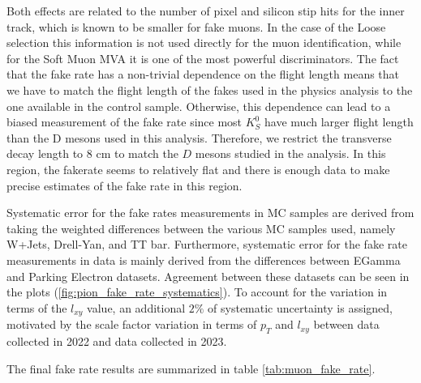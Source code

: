 Both effects are related to the number of pixel and silicon stip hits for the inner track, which is known to be smaller for fake muons. In the case of the Loose selection this information is not used directly for the muon identification, while for the Soft Muon MVA it is one of the most powerful discriminators. The fact that the fake rate has a non-trivial dependence on the flight length means that we have to match the flight length of the fakes used in the physics analysis to the one available in the control sample. Otherwise, this dependence can lead to a biased measurement of the fake rate since most $K_S^0$ have much larger flight length than the D mesons used in this analysis. Therefore, we restrict the transverse decay length to 8 cm to match the $D$ mesons studied in the analysis. In this region, the fakerate seems to relatively flat and there is enough data to make precise estimates of the fake rate in this region. 

Systematic error for the fake rates measurements in MC samples are derived from taking the weighted differences between the various MC samples used, namely W+Jets, Drell-Yan, and TT bar. Furthermore, systematic error for the fake rate measurements in data is mainly derived  from the differences between EGamma and Parking Electron datasets. Agreement between these datasets can be seen in the plots (\ref{fig:pion_fake_rate_systematics}). To account for the variation in terms of the $l_{xy}$ value, an additional $2\%$ of systematic uncertainty is assigned, motivated by the scale factor variation in terms of $p_T$ and $l_{xy}$ between data collected in 2022 and data collected in 2023. 

The final fake rate results are summarized in table \ref{tab:muon_fake_rate}.

